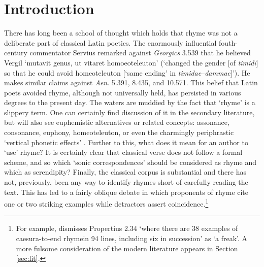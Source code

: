 \documentclass[twocolumn, switch]{article} %
\begin{document}
\section{Introduction}


There has long been a school of thought which holds that rhyme was not a
deliberate part of classical Latin poetics. The enormously influential
fouth-century commentator Servius remarked against \emph{Georgics} 3.539 that
he believed Vergil `mutavit genus, ut vitaret homoeoteleuton' (`changed the
gender [of \emph{timidi}] so that he could avoid homeoteleuton [`same ending'
in \emph{timidae}--\emph{dammae}]'). He makes similar claims against
\emph{Aen}. 5.391, 8.435, and 10.571. This belief that Latin poets avoided
rhyme, although not universally held, has persisted in various degrees to the
present day. The waters are muddied by the fact that `rhyme' is a slippery
term. One can certainly find discussion of it in the secondary literature, but
will also see euphemistic alternatives or related concepts: assonance,
consonance, euphony, homeoteleuton, or even the charmingly periphrastic
`vertical phonetic effects' \cite{vine_vertical_1989}. Further to this, what
does it mean for an author to `use' rhyme? It is certainly clear that
classical verse does not follow a formal scheme, and so which `sonic
correspondences' should be considered as rhyme and which as serendipity?
Finally, the classical corpus is substantial and there has not, previously,
been any way to identify rhymes short of carefully reading the text. This has
led to a fairly oblique debate in which proponents of rhyme cite one or two
striking examples while detractors assert coincidence.\footnote{
  For example,  dismisses Propertius 2.34
  `where there are 38 examples of caesura-to-end rhyme\textellipsis in 94 lines,
  including six in succession' as `a freak'. A more fulsome consideration of the
  modern literature appears in Section \ref{sec:lit}.
}
\end{document}
